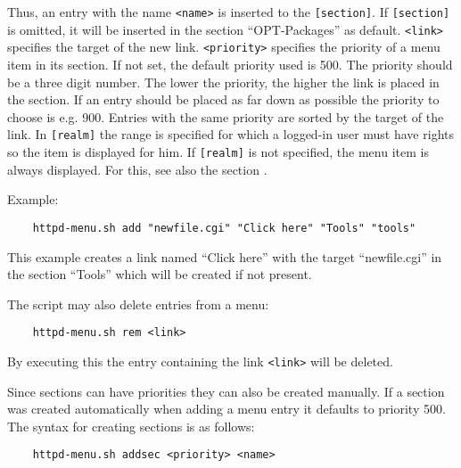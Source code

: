 Thus, an entry with the name \texttt{<name>} is inserted to the \texttt{[section]}.
If \texttt{[section]} is omitted, it will be inserted in the section ``OPT-Packages''
as default. \texttt{<link>} specifies the target of the new link. \texttt{<priority>}
specifies the priority of a menu item in its section. If not set, the default priority
used is 500. The priority should be a three digit number. The lower the
priority, the higher the link is placed in the section. If an entry should be
placed as far down as possible the priority to choose is e.g. 900. Entries with
the same priority are sorted by the target of the link.
In \texttt{[realm]} the range is specified for which a logged-in user must have
 rights so the item is displayed for him. If \texttt{[realm]} is not
specified, the menu item is always displayed.
For this, see also the section .

Example:

\begin{example}
\begin{verbatim}
    httpd-menu.sh add "newfile.cgi" "Click here" "Tools" "tools"
\end{verbatim}
\end{example}

This example creates a link named ``Click here'' with the target ``newfile.cgi''
in the section ``Tools'' which will be created if not present.

The script may also delete entries from a menu:

\begin{example}
\begin{verbatim}
    httpd-menu.sh rem <link>
\end{verbatim}
\end{example}

By executing this the entry containing the link \texttt{<link>} will be
deleted.


Since sections can have priorities they can also be created manually. If a section
was created automatically when adding a menu entry it defaults to priority 500.
The syntax for creating sections is as follows:

\begin{example}
\begin{verbatim}
    httpd-menu.sh addsec <priority> <name>
\end{verbatim}
\end{example}

